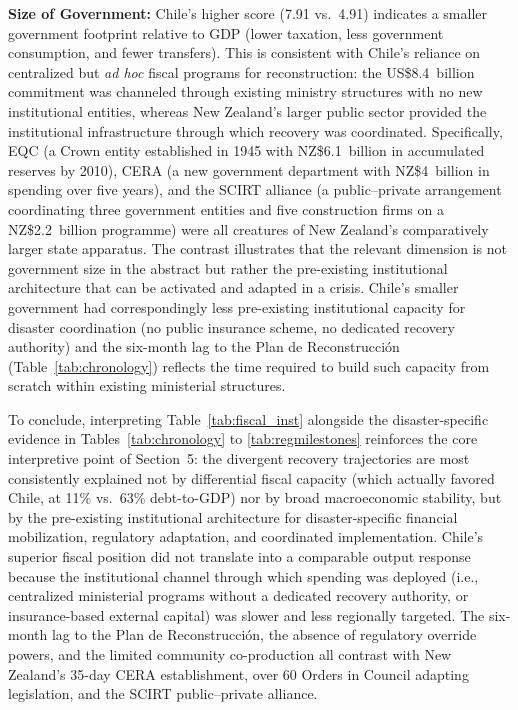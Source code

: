 \textbf{Size of Government:} Chile's higher score (7.91 vs.\ 4.91) indicates a smaller government footprint relative to GDP (lower taxation, less government consumption, and fewer transfers). This is consistent with Chile's reliance on centralized but \textit{ad hoc} fiscal programs for reconstruction: the US\$8.4~billion commitment was channeled through existing ministry structures with no new institutional entities, whereas New Zealand's larger public sector provided the institutional infrastructure through which recovery was coordinated. Specifically, EQC (a Crown entity established in 1945 with NZ\$6.1~billion in accumulated reserves by 2010), CERA (a new government department with NZ\$4~billion in spending over five years), and the SCIRT alliance (a public--private arrangement coordinating three government entities and five construction firms on a NZ\$2.2~billion programme) were all creatures of New Zealand's comparatively larger state apparatus. The contrast illustrates that the relevant dimension is not government size in the abstract but rather the pre-existing institutional architecture that can be activated and adapted in a crisis. Chile's smaller government had correspondingly less pre-existing institutional capacity for disaster coordination (no public insurance scheme, no dedicated recovery authority) and the six-month lag to the Plan de Reconstrucci{\'o}n (Table~\ref{tab:chronology}) reflects the time required to build such capacity from scratch within existing ministerial structures.

To conclude, interpreting Table~\ref{tab:fiscal_inst} alongside the disaster-specific evidence in Tables~\ref{tab:chronology} to \ref{tab:regmilestones} reinforces the core interpretive point of Section~5: the divergent recovery trajectories are most consistently explained not by differential fiscal capacity (which actually favored Chile, at 11\% vs.\ 63\% debt-to-GDP) nor by broad macroeconomic stability, but by the pre-existing institutional architecture for disaster-specific financial mobilization, regulatory adaptation, and coordinated implementation. Chile's superior fiscal position did not translate into a comparable output response because the institutional channel through which spending was deployed (i.e., centralized ministerial programs without a dedicated recovery authority, or insurance-based external capital) was slower and less regionally targeted. The six-month lag to the Plan de Reconstrucci{\'o}n, the absence of regulatory override powers, and the limited community co-production all contrast with New Zealand's 35-day CERA establishment, over 60 Orders in Council adapting legislation, and the SCIRT public--private alliance.
